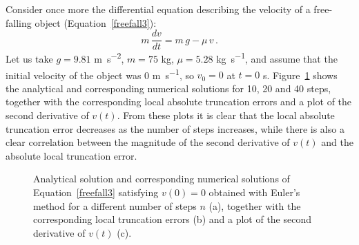 \begin{example}
Consider once more the differential equation describing the velocity of a free-falling object (Equation~\eqref{freefall3}):
$$
m\,\dfrac{d v}{d t}=m\,g-\mu\,v\,.
$$
Let us take  $g=9.81$ \si{m.s^{-2}}, $m=75$ \si{kg}, $\mu=5.28$ \si{kg.s^{-1}}, and assume that the initial velocity of the object was 0 \si{m.s^{-1}}, so $v_0=0$ at $t = 0$ \si{s}. Figure~\ref{etEuler} shows the analytical and corresponding numerical solutions for 10, 20 and 40 steps, together with the corresponding local absolute truncation errors and a plot of the second derivative of $v(t)$. From these plots it is clear that the local absolute truncation error decreases as the number of steps increases, while there is also a clear correlation between the magnitude of the second derivative of $v(t)$ and the absolute local truncation error. 

\begin{figure}[H]
\centering
\centerline{
\hspace{1cm}
}
\centerline{
}
\caption{Analytical solution and corresponding numerical solutions of Equation~\eqref{freefall3} satisfying $v(0)=0$ obtained with Euler's method  for a different number of steps $n$ (a), together with the corresponding local truncation errors (b) and a plot of the second derivative of $v(t)$ (c).}
\label{etEuler}
\end{figure}


\end{example}


